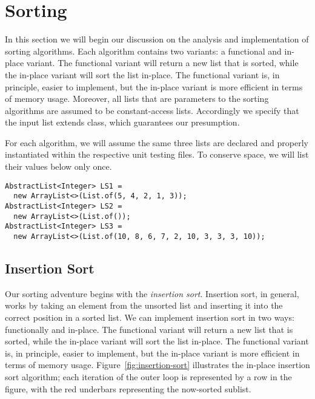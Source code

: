 \section{Sorting}
In this section we will begin our discussion on the analysis and implementation of sorting algorithms. Each algorithm contains two variants: a functional and in-place variant. The functional variant will return a new list that is sorted, while the in-place variant will sort the list in-place. The functional variant is, in principle, easier to implement, but the in-place variant is more efficient in terms of memory usage. Moreover, all lists that are parameters to the sorting algorithms are assumed to be constant-access lists. Accordingly we specify that the input list extends  class, which guarantees our presumption.

For each algorithm, we will assume the same three lists are declared and properly instantiated within the respective unit testing files. To conserve space, we will list their values below only once.

\begin{footnotesize}
\begin{verbatim}
AbstractList<Integer> LS1 = 
  new ArrayList<>(List.of(5, 4, 2, 1, 3));
AbstractList<Integer> LS2 = 
  new ArrayList<>(List.of());
AbstractList<Integer> LS3 = 
  new ArrayList<>(List.of(10, 8, 6, 7, 2, 10, 3, 3, 3, 10));
\end{verbatim}
\end{footnotesize}

\subsection*{Insertion Sort}
Our sorting adventure begins with the \textit{insertion sort}. Insertion sort, in general, works by taking an element from the unsorted list and inserting it into the correct position in a sorted list. We can implement insertion sort in two ways: functionally and in-place. The functional variant will return a new list that is sorted, while the in-place variant will sort the list in-place. The functional variant is, in principle, easier to implement, but the in-place variant is more efficient in terms of memory usage. Figure~\ref{fig:insertion-sort} illustrates the in-place insertion sort algorithm; each iteration of the outer loop is represented by a row in the figure, with the red underbars representing the now-sorted sublist.

